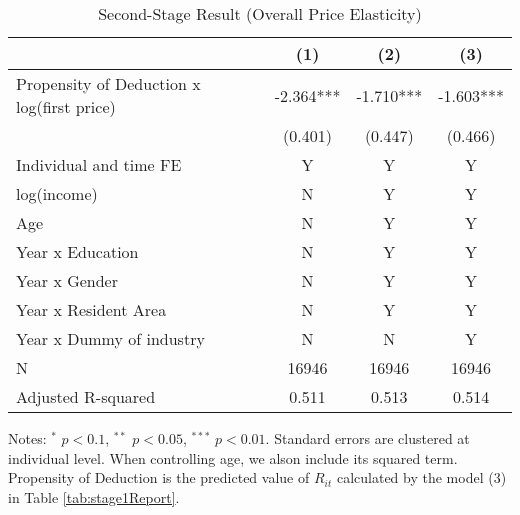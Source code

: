 \documentclass[
  11pt,
  a4paper,
]{article}
\begin{document}
\begin{table}

\caption{\label{tab:OverallReport}Second-Stage Result (Overall Price Elasticity)}
\centering
\fontsize{7}{9}\selectfont
\begin{threeparttable}
\begin{tabular}[t]{lccc}
\toprule
 & (1) & (2) & (3)\\
\midrule
Propensity of Deduction x log(first price) & -2.364*** & -1.710*** & -1.603***\\
 & (0.401) & (0.447) & (0.466)\\
Individual and time FE & Y & Y & Y\\
log(income) & N & Y & Y\\
Age & N & Y & Y\\
Year x Education & N & Y & Y\\
Year x Gender & N & Y & Y\\
Year x Resident Area & N & Y & Y\\
Year x Dummy of industry & N & N & Y\\
N & 16946 & 16946 & 16946\\
Adjusted R-squared & 0.511 & 0.513 & 0.514\\
\bottomrule
\end{tabular}
\begin{tablenotes}
\item Notes: $^{*}$ $p < 0.1$, $^{**}$ $p < 0.05$, $^{***}$ $p < 0.01$. Standard errors are clustered at individual level. When controlling age, we alson include its squared term. Propensity of Deduction is the predicted value of $R_{it}$ calculated by the model (3) in Table \ref{tab:stage1Report}.
\end{tablenotes}
\end{threeparttable}
\end{table}
\end{document}
